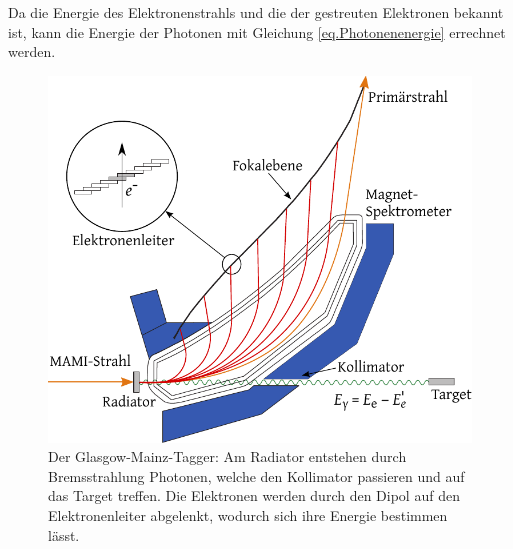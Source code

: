 \documentclass[a4paper,11pt,oneside,final,german,openbib,pdftex]{scrbook}
\begin{document}
{ Da die Energie des Elektronenstrahls und die der gestreuten Elektronen bekannt ist, kann die Energie der Photonen mit Gleichung \ref{eq.Photonenenergie} errechnet werden.
\newline 
\begin{figure}[h!]
	\begin{center}
	\includegraphics{TAGGER-New}
	
	\caption[Prinzip des Glasgow-Mainz-Taggers]{Der Glasgow-Mainz-Tagger: Am Radiator entstehen durch Bremsstrahlung Photonen, welche den Kollimator passieren und auf das Target treffen. Die Elektronen werden durch den Dipol auf den Elektronenleiter abgelenkt, wodurch sich ihre Energie bestimmen lässt.\cite{Un08}}
\label{fig.TAGGER}	
\end{center}
\end{figure}
 
}
\end{document}
